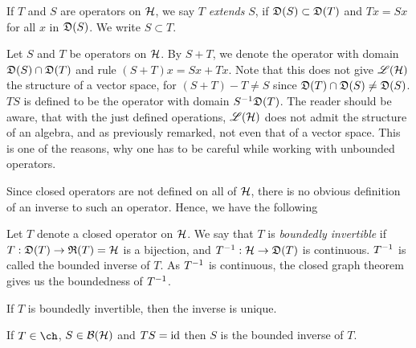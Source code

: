 \begin{defi}
  If $T$ and $S$ are operators on $\mathcal{H}$, we say $T$ \textit{extends} $S$,
  if $\mathfrak{D}(S)\subset
  \mathfrak{D}(T)$ and $ Tx = Sx$ for all $x$ in $ \mathfrak{D} (S)$. We write $S \subset T$.
\end{defi}

Let $S$ and $ T$ be operators on $\mathcal{H}$. By $S + T$,  we denote
the operator with domain 
$\mathfrak{D}(S) \cap \mathfrak{D}(T)$ and rule $(S + T)x = Sx + Tx$. Note that this does
not give $\mathscr{L}(\mathcal{H})$ the structure of a vector space, for 
$(S + T) - T \neq S$ since
$\mathfrak{D}(T)\cap \mathfrak{D}(S) \neq \mathfrak{D}(S)$.
$TS$ is defined to be the operator with domain $S^{-1} \mathfrak{D}(T)$. The reader should
be aware, that with the just defined operations, $\mathscr{L}(\mathcal{H})$ does not admit the
structure of an algebra, and as previously remarked, not even that of a
vector space. This is one
of the reasons, why one has to be careful while working with unbounded
operators. 

Since closed operators are not defined on all of $\mathcal{H}$,
there is no obvious definition of an inverse to such an operator.
Hence, we have the following

\begin{defi}
 Let $T$ denote a closed operator on $\mathcal{H}$. We say that $T$ is \textit{boundedly invertible} if
 $T:\mathfrak{D}(T) \to \mathfrak{R}(T)= \mathcal{H}$ is a bijection, and $T^{-1} :\mathcal{H} \to \mathfrak{D}(T)$
 is continuous. $T^{-1}$ is called the bounded inverse of $T$. As $T^{-1}$ is
 continuous, the closed graph theorem gives us the boundedness of $T^{-1}$.
\end{defi}

\begin{rem}
 If $T$ is boundedly invertible, then the inverse is unique.
\end{rem}

% 
% 
% 


\begin{lem}
 If $T \in \ch$, $S \in \mathcal{B}(\mathcal{H})$ and $ TS = \operatorname{id}$ then $S$ is the bounded inverse of $T$.
\end{lem}

